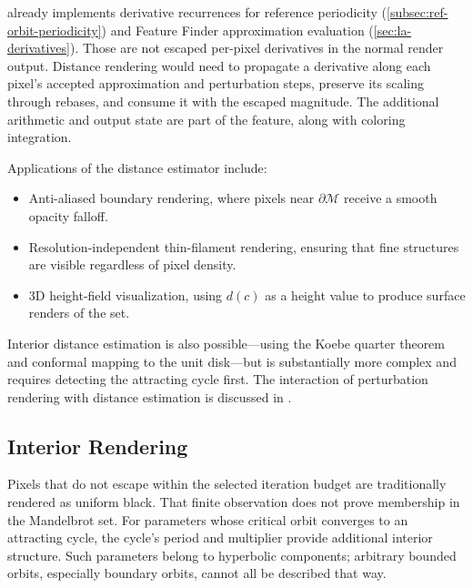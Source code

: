 \FractalShark{} already implements derivative recurrences for reference
periodicity (\cref{subsec:ref-orbit-periodicity}) and Feature Finder
approximation evaluation (\cref{sec:la-derivatives}).  Those are not escaped
per-pixel derivatives in the normal render output.  Distance rendering would
need to propagate a derivative along each pixel's accepted approximation and
perturbation steps, preserve its scaling through rebases, and consume it with
the escaped magnitude.  The additional arithmetic and output state are part
of the feature, along with coloring integration.

Applications of the distance estimator include:
\begin{itemize}
  \item Anti-aliased boundary rendering, where pixels near $\partial
        \mathcal{M}$ receive a smooth opacity falloff.
  \item Resolution-independent thin-filament rendering, ensuring that
        fine structures are visible regardless of pixel density.
  \item 3D height-field visualization, using $d(c)$ as a height value
        to produce surface renders of the set.
\end{itemize}

Interior distance estimation is also possible—using the Koebe quarter
theorem and conformal mapping to the unit disk—but is substantially more
complex and requires detecting the attracting cycle first.  The
interaction of perturbation rendering with distance estimation is
discussed in \cite{HeilandAllen2013Perturbation}.

\subsection{Interior Rendering}
\label{subsec:interior-rendering}

Pixels that do not escape within the selected iteration budget are
traditionally rendered as uniform black.  That finite observation does not
prove membership in the Mandelbrot set.  For parameters whose critical orbit
converges to an attracting cycle, the cycle's period and multiplier provide
additional interior structure.  Such parameters belong to hyperbolic
components; arbitrary bounded orbits, especially boundary orbits, cannot all
be described that way.

